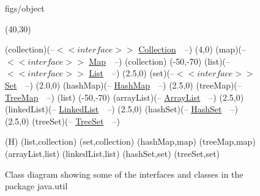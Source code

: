 



\begin {figure}

\Draw

 {figs/object}

\MinNodeSize(40,30)


\RectNode (collection)(--$<<interface>>$
		\underline{Collection}~~--)
\MoveToExit(4,0)
\RectNode (map)(--$<<interface>>$
		\underline{Map}~~--)
\MoveToLoc(collection)
\Move(-50,-70)
\RectNode(list)(--$<<interface>>$
		\underline{List}~~--)
\MoveToExit(2.5,0)
\RectNode (set)(--$<<interface>>$
		\underline{Set}~~--)
\MoveToExit(2.0,0)
\RectNode(hashMap)(--
		\underline{HashMap}~~--)
\MoveToExit(2.5,0)
\RectNode(treeMap)(--
		\underline{TreeMap}~~--)
\MoveToLoc(list)
\Move(-50,-70)
\RectNode(arrayList)(--
		\underline{ArrayList}~~--)
\MoveToExit(2.5,0)
\RectNode(linkedList)(--
		\underline{LinkedList}~~--)
\MoveToExit(2.5,0)
\RectNode(hashSet)(--
		\underline{HashSet}~~--)
\MoveToExit(2.5,0)
\RectNode(treeSet)(--
		\underline{TreeSet}~~--)


\ArrowSpec (H)
\Edge(list,collection)
\Edge(set,collection)
\Edge(hashMap,map)
\Edge(treeMap,map)
\Edge(arrayList,list)
\Edge(linkedList,list)
\Edge(hashSet,set)
\Edge(treeSet,set)

\EndDraw

\caption {Class diagram showing some of the interfaces
and classes in the package java.util}


\label {fig:collectionClasses}

\end {figure}


